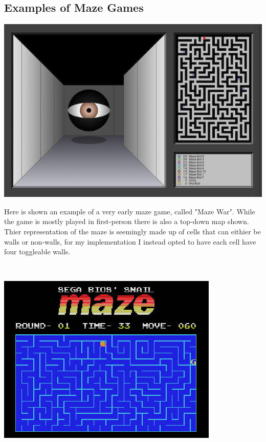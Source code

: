 \documentclass{article}
\begin{document}
\subsection{Examples of Maze Games}
\begin{minipage}{0.4\textwidth}
\includegraphics[scale=0.3]{example of old maze}
\end{minipage}
\begin{minipage}{0.5\textwidth}\raggedright
Here is shown an example of a very early maze game, called "Maze War". While the game is mostly played in first-person there is also a top-down map
shown. Thier representation of the maze is seemingly made up of cells that can eithier be walls or non-walls, for my implementation I instead opted to
have each cell have four toggleable walls. 
\end{minipage}
\linebreak
\\
\linebreak
\begin{minipage}{0.4\textwidth}
\includegraphics[scale=0.48]{better example}
\end{minipage}
\end{document}
